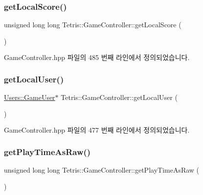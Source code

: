 \subsubsection{\texorpdfstring{get\+Local\+Score()}{getLocalScore()}}
{\footnotesize\ttfamily unsigned long long Tetris\+::\+Game\+Controller\+::get\+Local\+Score (\begin{DoxyParamCaption}{ }\end{DoxyParamCaption})\hspace{0.3cm}{\ttfamily [inline]}}



Game\+Controller.\+hpp 파일의 485 번째 라인에서 정의되었습니다.

\mbox{\label{class_tetris_1_1_game_controller_abc67d4b309ce2886b43a3b4e0af22abc}} 
\subsubsection{\texorpdfstring{get\+Local\+User()}{getLocalUser()}}
{\footnotesize\ttfamily \hyperlink{class_tetris_1_1_users_1_1_game_user}{Users\+::\+Game\+User}$\ast$ Tetris\+::\+Game\+Controller\+::get\+Local\+User (\begin{DoxyParamCaption}{ }\end{DoxyParamCaption})\hspace{0.3cm}{\ttfamily [inline]}}



Game\+Controller.\+hpp 파일의 477 번째 라인에서 정의되었습니다.

\mbox{\label{class_tetris_1_1_game_controller_afce7f1fc500acedd99636b837f9bccf4}} 
\subsubsection{\texorpdfstring{get\+Play\+Time\+As\+Raw()}{getPlayTimeAsRaw()}}
{\footnotesize\ttfamily unsigned long long Tetris\+::\+Game\+Controller\+::get\+Play\+Time\+As\+Raw (\begin{DoxyParamCaption}{ }\end{DoxyParamCaption})\hspace{0.3cm}{\ttfamily [inline]}}

